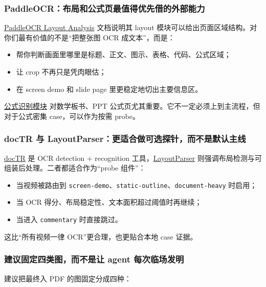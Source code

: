 \documentclass[a4paper]{article}
\begin{document}
\subsubsection{PaddleOCR：布局和公式页最值得优先借的外部能力}

\href{https://www.paddleocr.ai/latest/en/version3.x/module_usage/layout_analysis.html}{PaddleOCR Layout Analysis} 文档说明其 layout 模块可以给出页面区域结构。对你们最有价值的不是“把整张图 OCR 成文本”，而是：

\begin{itemize}
\item 帮你判断画面里哪里是标题、正文、图示、表格、代码、公式区域；
\item 让 crop 不再只是凭肉眼估；
\item 在 screen demo 和 slide page 里更稳定地切出主要信息区。
\end{itemize}

\href{https://www.paddleocr.ai/main/en/version3.x/module_usage/formula_recognition.html}{公式识别模块} 对数学板书、PPT 公式页尤其重要。它不一定必须上到主流程，但对于公式密集 case，可以作为按需 probe。

\subsubsection{docTR 与 LayoutParser：更适合做可选探针，而不是默认主线}

\href{https://mindee.github.io/doctr/latest/}{docTR} 是 OCR detection + recognition 工具，\href{https://layout-parser.github.io/}{LayoutParser} 则强调布局检测与可组装后处理。二者都适合作为“probe 组件”：

\begin{itemize}
\item 当视频被路由到 \texttt{screen-demo}、\texttt{static-outline}、\texttt{document-heavy} 时启用；
\item 当 OCR 得分、布局稳定性、文本面积超过阈值时再继续；
\item 当进入 \texttt{commentary} 时直接跳过。
\end{itemize}

这比“所有视频一律 OCR”更合理，也更贴合本地 case 证据。

\subsubsection{建议固定四类图，而不是让 agent 每次临场发明}

建议把最终入 PDF 的图固定分成四种：
\end{document}
